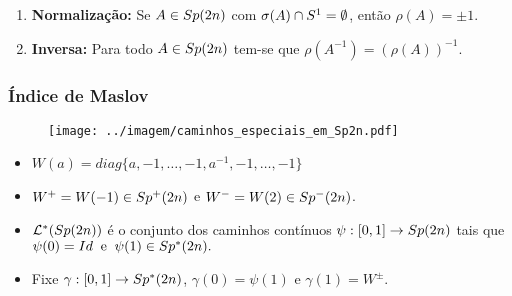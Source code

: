 \documentclass{beamer}
\begin{document}
\begin{footnotesize}
\begin{frame}
\begin{scriptsize}
\begin{enumerate}
			\item \textbf{Normalização:} Se $A \in Sp(2n)$ com $\sigma(A)\cap S^{1} = \emptyset$, então $\rho(A) = \pm 1$.
			
			
			\item  \textbf{Inversa:} Para todo $A \in Sp(2n)$ tem-se que $\rho(A^{-1})=(\rho(A))^{-1}$. 
			
			\end{enumerate}
		\end{scriptsize}
	\end{frame}
	
		\begin{frame}
			\frametitle{Índice de Maslov}
			\begin{minipage}[t]{0.5\linewidth}
				\begin{figure}[!h]
					\centering
					\texttt{[image: ../imagem/caminhos\_especiais\_em\_Sp2n.pdf]}
				\end{figure}
			\end{minipage}
			\hfill%
			\begin{minipage}[t]{0.3\linewidth}
				
				
			\end{minipage}
			
			\begin{scriptsize}
				\begin{itemize}
					\item $W(a) = diag\{a,-1,\dots,-1, a^{-1},-1,\dots,-1\}$
					\item $W^{+}=W(-1) \in  Sp^{+}(2n)$
					e 
					$W^{-} = W(2)\in Sp^{-}(2n)$.
				\end{itemize}
				
			
				
			\begin{definicao}
				
				\begin{itemize}
					\item $
					\mathcal{L}^{*}(Sp(2n))$ é o conjunto dos caminhos contínuos $ \psi : [0,1] \to Sp(2n)$ tais que $\psi(0)=Id \;\; \text{e}\;\; \psi(1)\in Sp^{*}(2n).
					$
					
					\item Fixe $\gamma :[0,1] \to Sp^{*}(2n)$, $\gamma(0)=\psi(1)$ e $\gamma(1)=W^{\pm}$. 
					

\end{itemize}
\end{definicao}
\end{scriptsize}
\end{frame}
\end{footnotesize}
\end{document}

